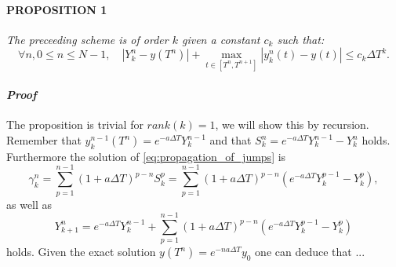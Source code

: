 \paragraph{\textsc{PROPOSITION 1}} \textit{The preceeding scheme is of order $k$ given a constant $c_k$ such that:}
\begin{equation}
\forall n, 0 \leq n \leq N-1, \quad |Y_k^n-y(T^n)|+\max_{t\in[T^n,T^{n+1}]}|y_k^n(t) - y(t)| \leq c_k \Delta T^k.
\end{equation}

\paragraph{\textit{Proof}} The proposition is trivial for $rank(k) = 1$, we will show this by recursion. 
Remember that $y_k^{n-1}(T^n) = e^{-a\Delta T}Y_k^{n-1}$ and that $S_k^n = e^{-a\Delta T}Y_k^{n-1} - Y_k^n$ holds.
Furthermore the solution of \eqref{eq:propagation_of_jumps} is
\begin{equation}
\gamma_k^n = \sum_{p=1}^{n-1} (1+a\Delta T)^{p-n}S_k^p = \sum_{p=1}^{n-1} (1+a \Delta T)^{p-n}(e^{-a\Delta T} Y_k^{p-1} - Y_k^p),
\end{equation}
as well as 
\begin{equation}
Y_{k+1}^n = e^{-a\Delta T}Y_k^{n-1} + \sum_{p=1}^{n-1}(1+a\Delta T)^{p-n}(e^{-a\Delta T}Y_k^{p-1} - Y_k^p)
\end{equation}
holds. Given the exact solution $y(T^n) = e^{-na\Delta T}y_0$ 
one can deduce that ...

